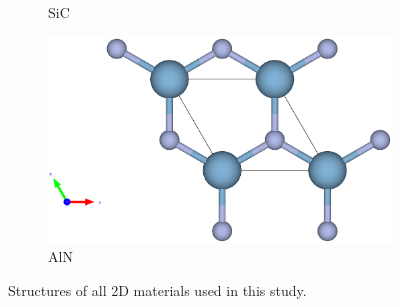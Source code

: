\begin{figure}[htb]
\begin{subfigure}{0.3\textwidth}
  \caption{SiC}
\end{subfigure}
\medskip
\begin{subfigure}{0.3\textwidth}
  \includegraphics[width=\linewidth]{images/aln_st_2d.eps}
  \caption{AlN}
\end{subfigure}

\caption{Structures of all 2D materials used in this study.}
\label{fig:2d_materials_structure}

\end{figure}

